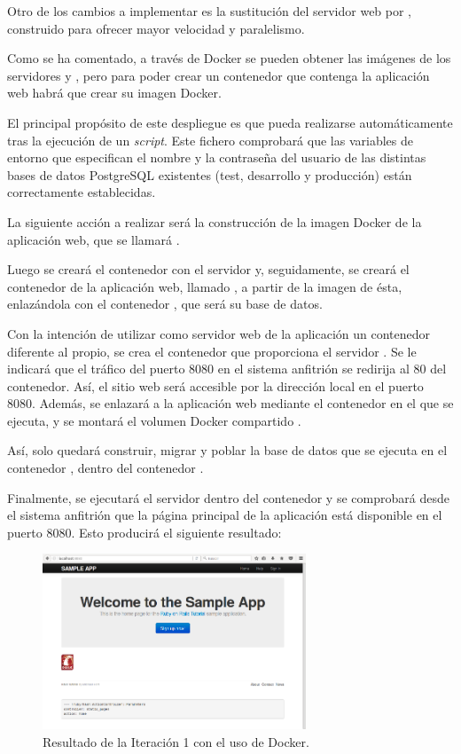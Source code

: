 Otro de los cambios a implementar es la sustitución del servidor web  por , construido para ofrecer mayor velocidad y paralelismo.

Como se ha comentado, a través de Docker se pueden obtener las imágenes de los servidores  y , pero para poder crear un contenedor que contenga la aplicación web habrá que crear su imagen Docker. 

El principal propósito de este despliegue es que pueda realizarse automáticamente tras la ejecución de un \textit{script}. Este fichero comprobará que las variables de entorno que especifican el nombre y la contraseña del usuario de las distintas bases de datos PostgreSQL existentes (test, desarrollo y producción) están correctamente establecidas.

La siguiente acción a realizar será la construcción de la imagen Docker de la aplicación web, que se llamará . 

Luego se creará el contenedor  con el servidor  y, seguidamente, se creará el contenedor de la aplicación web, llamado , a partir de la imagen de ésta, enlazándola con el contenedor , que será su base de datos.

Con la intención de utilizar como servidor web de la aplicación un contenedor diferente al propio, se crea el contenedor  que proporciona el servidor . Se le indicará que el tráfico del puerto 8080 en el sistema anfitrión se redirija al 80 del contenedor. Así, el sitio web será accesible por la dirección local en el puerto 8080. Además, se enlazará a la aplicación web mediante el contenedor en el que se ejecuta, y se montará el volumen Docker compartido .

Así, solo quedará construir, migrar y poblar la base de datos que se ejecuta en el contenedor , dentro del contenedor .

Finalmente, se ejecutará el servidor  dentro del contenedor  y se comprobará desde el sistema anfitrión que la página principal de la aplicación  está disponible en el puerto 8080. Esto producirá el siguiente resultado:

\begin{figure}[H]
\centering
\includegraphics[width=0.7\textwidth]{images/figures/resultado1.png}
\caption{Resultado de la Iteración 1 con el uso de Docker.}
\end{figure}

